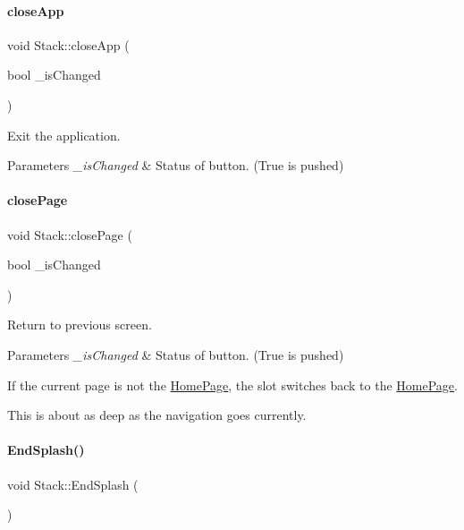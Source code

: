 \paragraph{\texorpdfstring{closeApp}{closeApp}}
{\footnotesize\ttfamily void Stack\+::close\+App (\begin{DoxyParamCaption}\item[{bool}]{\+\_\+is\+Changed }\end{DoxyParamCaption})\hspace{0.3cm}{\ttfamily [slot]}}

Exit the application. 
\begin{DoxyParams}{Parameters}
{\em \+\_\+is\+Changed} & Status of button. (True is pushed) \\
\hline
\end{DoxyParams}
\mbox{\label{classStack_a69cd464c336cb480ad54ac2c83c309e1}} 
\paragraph{\texorpdfstring{closePage}{closePage}}
{\footnotesize\ttfamily void Stack\+::close\+Page (\begin{DoxyParamCaption}\item[{bool}]{\+\_\+is\+Changed }\end{DoxyParamCaption})\hspace{0.3cm}{\ttfamily [slot]}}

Return to previous screen. 
\begin{DoxyParams}{Parameters}
{\em \+\_\+is\+Changed} & Status of button. (True is pushed)\\
\hline
\end{DoxyParams}
If the current page is not the \mbox{\hyperlink{classHomePage}{Home\+Page}}, the slot switches back to the \mbox{\hyperlink{classHomePage}{Home\+Page}}.

This is about as deep as the navigation goes currently. \mbox{\label{classStack_ac608632a7155f01a24a9713f5fde915e}} 
\paragraph{\texorpdfstring{EndSplash()}{EndSplash()}}
{\footnotesize\ttfamily void Stack\+::\+End\+Splash (\begin{DoxyParamCaption}{ }\end{DoxyParamCaption})}


